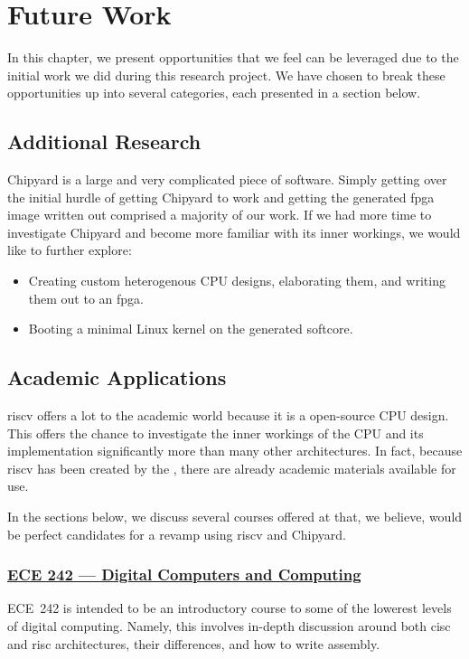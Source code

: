 \chapter{Future Work}\label{chap:Future_Work}
In this chapter, we present opportunities that we feel can be leveraged due to the initial work we did during this research project.
We have chosen to break these opportunities up into several categories, each presented in a section below.

\section{Additional Research}\label{sec:Additional_Research}
Chipyard is a large and very complicated piece of software.
Simply getting over the initial hurdle of getting Chipyard to work and getting the generated \Gls{fpga} image written out comprised a majority of our work.
If we had more time to investigate Chipyard and become more familiar with its inner workings, we would like to further explore:
\begin{itemize}
\item Creating custom heterogenous CPU designs, elaborating them, and writing them out to an \Gls{fpga}.
\item Booting a minimal Linux kernel on the generated \gls{softcore}.
\end{itemize}

\section{Academic Applications}\label{sec:Academic_Applications}
\Gls{riscv} offers a lot to the academic world because it is a open-source CPU design.
This offers the chance to investigate the inner workings of the CPU and its implementation significantly more than many other architectures.
In fact, because \Gls{riscv} has been created by the \UCB{}, there are already academic materials available for use.

In the sections below, we discuss several courses offered at \IIT{} that, we believe, would be perfect candidates for a revamp using \Gls{riscv} and Chipyard.

\subsection{\href{http://bulletin.iit.edu/search/?P=ECE 242}{ECE 242 --- Digital Computers and Computing}}\label{sec:ECE_242}
ECE~242 is intended to be an introductory course to some of the lowerest levels of digital computing.
Namely, this involves in-depth discussion around both \Gls{cisc} and \Gls{risc} architectures, their differences, and how to write \gls{assembly}.

